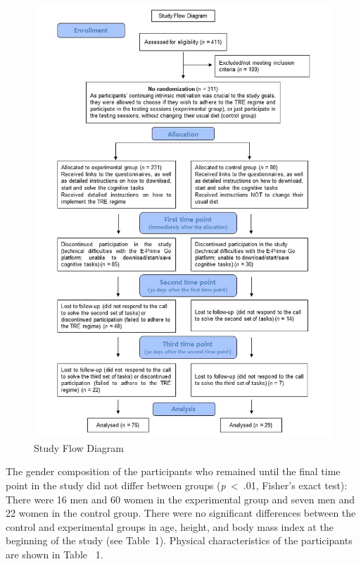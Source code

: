 \documentclass[authordate, empirical]{jote-new-article}
\begin{document}
\begin{figure}
  \begin{fullwidth}

    \centering
    \includegraphics[scale=0.75]{media/image1.jpg}

    \caption{Study Flow Diagram}

    \label{fig:rId8}
  \end{fullwidth}


\end{figure}








The gender composition of the participants who remained until the final time point in the study did not differ between groups (\emph{p~}<~.01, Fisher's exact test): There were 16 men and 60 women in the experimental group and seven men and 22 women in the control group. There were no significant differences between the control and experimental groups in age, height, and body mass index at the beginning of the study (see Table~1). Physical characteristics of the participants are shown in Table ~1.
\end{document}
